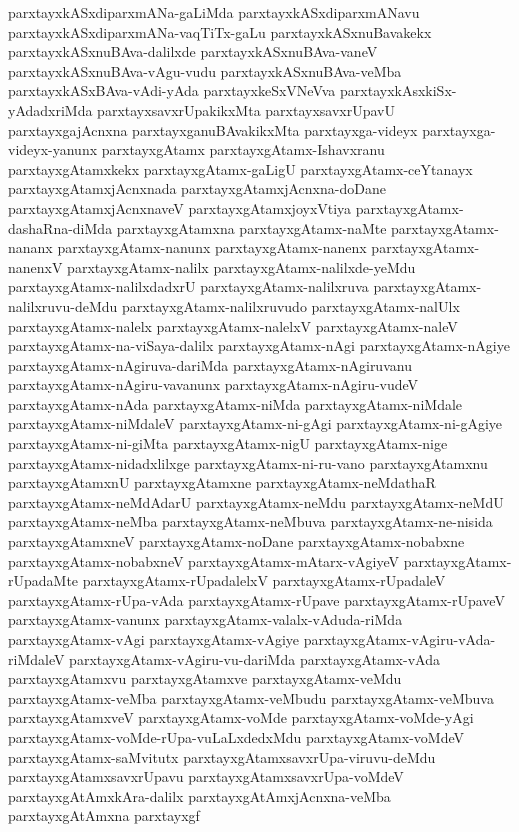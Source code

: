 {parxtayxkASxdiparxmANa-gaLiMda
parxtayxkASxdiparxmANavu
parxtayxkASxdiparxmANa-vaqTiTx-gaLu
parxtayxkASxnuBavakekx
parxtayxkASxnuBAva-dalilxde
parxtayxkASxnuBAva-vaneV
parxtayxkASxnuBAva-vAgu-vudu
parxtayxkASxnuBAva-veMba
parxtayxkASxBAva-vAdi-yAda
parxtayxkeSxVNeVva
parxtayxkAsxkiSx-yAdadxriMda
parxtayxsavxrUpakikxMta
parxtayxsavxrUpavU
parxtayxgajAcnxna
parxtayxganuBAvakikxMta
parxtayxga-videyx
parxtayxga-videyx-yanunx
parxtayxgAtamx
parxtayxgAtamx-Ishavxranu
parxtayxgAtamxkekx
parxtayxgAtamx-gaLigU
parxtayxgAtamx-ceYtanayx
parxtayxgAtamxjAcnxnada
parxtayxgAtamxjAcnxna-doDane
parxtayxgAtamxjAcnxnaveV
parxtayxgAtamxjoyxVtiya
parxtayxgAtamx-dashaRna-diMda
parxtayxgAtamxna
parxtayxgAtamx-naMte
parxtayxgAtamx-nananx
parxtayxgAtamx-nanunx
parxtayxgAtamx-nanenx
parxtayxgAtamx-nanenxV
parxtayxgAtamx-nalilx
parxtayxgAtamx-nalilxde-yeMdu
parxtayxgAtamx-nalilxdadxrU
parxtayxgAtamx-nalilxruva
parxtayxgAtamx-nalilxruvu-deMdu
parxtayxgAtamx-nalilxruvudo
parxtayxgAtamx-nalUlx
parxtayxgAtamx-nalelx
parxtayxgAtamx-nalelxV
parxtayxgAtamx-naleV
parxtayxgAtamx-na-viSaya-dalilx
parxtayxgAtamx-nAgi
parxtayxgAtamx-nAgiye
parxtayxgAtamx-nAgiruva-dariMda
parxtayxgAtamx-nAgiruvanu
parxtayxgAtamx-nAgiru-vavanunx
parxtayxgAtamx-nAgiru-vudeV
parxtayxgAtamx-nAda
parxtayxgAtamx-niMda
parxtayxgAtamx-niMdale
parxtayxgAtamx-niMdaleV
parxtayxgAtamx-ni-gAgi
parxtayxgAtamx-ni-gAgiye
parxtayxgAtamx-ni-giMta
parxtayxgAtamx-nigU
parxtayxgAtamx-nige
parxtayxgAtamx-nidadxlilxge
parxtayxgAtamx-ni-ru-vano
parxtayxgAtamxnu
parxtayxgAtamxnU
parxtayxgAtamxne
parxtayxgAtamx-neMdathaR
parxtayxgAtamx-neMdAdarU
parxtayxgAtamx-neMdu
parxtayxgAtamx-neMdU
parxtayxgAtamx-neMba
parxtayxgAtamx-neMbuva
parxtayxgAtamx-ne-nisida
parxtayxgAtamxneV
parxtayxgAtamx-noDane
parxtayxgAtamx-nobabxne
parxtayxgAtamx-nobabxneV
parxtayxgAtamx-mAtarx-vAgiyeV
parxtayxgAtamx-rUpadaMte
parxtayxgAtamx-rUpadalelxV
parxtayxgAtamx-rUpadaleV
parxtayxgAtamx-rUpa-vAda
parxtayxgAtamx-rUpave
parxtayxgAtamx-rUpaveV
parxtayxgAtamx-vanunx
parxtayxgAtamx-valalx-vAduda-riMda
parxtayxgAtamx-vAgi
parxtayxgAtamx-vAgiye
parxtayxgAtamx-vAgiru-vAda-riMdaleV
parxtayxgAtamx-vAgiru-vu-dariMda
parxtayxgAtamx-vAda
parxtayxgAtamxvu
parxtayxgAtamxve
parxtayxgAtamx-veMdu
parxtayxgAtamx-veMba
parxtayxgAtamx-veMbudu
parxtayxgAtamx-veMbuva
parxtayxgAtamxveV
parxtayxgAtamx-voMde
parxtayxgAtamx-voMde-yAgi
parxtayxgAtamx-voMde-rUpa-vuLaLxdedxMdu
parxtayxgAtamx-voMdeV
parxtayxgAtamx-saMvitutx
parxtayxgAtamxsavxrUpa-viruvu-deMdu
parxtayxgAtamxsavxrUpavu
parxtayxgAtamxsavxrUpa-voMdeV
parxtayxgAtAmxkAra-dalilx
parxtayxgAtAmxjAcnxna-veMba
parxtayxgAtAmxna
parxtayxgf
}
